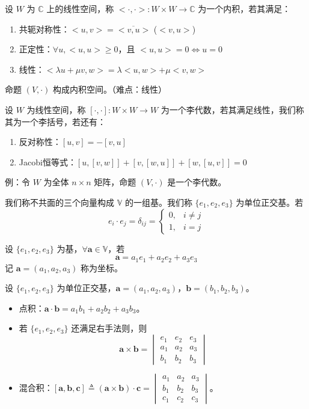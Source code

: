 \documentclass[lang=cn,10pt,thmcnt=section]{elegantbook}
\renewcommand{\vec}[1]{\mathbf{#1}}
\begin{document}
\begin{definition}[内积]
    设 $W$ 为 $\mathbb{C}$ 上的线性空间，称 $<\cdot,\cdot> : W \times W \rightarrow \mathbb{C}$ 为一个内积，若其满足：
    \begin{enumerate}
        \item 共轭对称性：$<u,v> = \overline{<v,u>}$ ($<v,u>$)
        \item 正定性：$\forall u, <u,u> \geq 0$，且 $<u,u> = 0 \Leftrightarrow u = 0$
        \item 线性：$<\lambda u + \mu v, w> = \lambda <u,w> + \mu <v,w>$
    \end{enumerate}
    命题 $(V, \cdot)$ 构成内积空间。（难点：线性）
    \end{definition}
    
    \begin{definition}[李括号]
    设 $W$ 为线性空间，称 $[ \cdot, \cdot ] : W \times W \rightarrow W$ 为一个李代数，若其满足线性，我们称其为一个李括号，若还有：
    \begin{enumerate}
        \item 反对称性：$[u,v] = -[v,u]$
        \item Jacobi恒等式：$[u,[v,w]] + [v,[w,u]] + [w,[u,v]] = 0$
    \end{enumerate}
    例：令 $W$ 为全体 $n \times n$ 矩阵，命题 $(V, \cdot)$ 是一个李代数。
\end{definition}
\begin{definition}[基和坐标]
    我们称不共面的三个向量构成 $\mathbb{V}$ 的一组基。我们称 $\{e_1, e_2, e_3\}$ 为单位正交基。若
\[
e_i \cdot e_j = \delta_{ij} = 
\begin{cases} 
0, & i \neq j \\
1, & i = j 
\end{cases}
\]

设 $\{e_1, e_2, e_3\}$ 为基，$\forall \vec{a} \in \mathbb{V}$，若
\[
\vec{a} = a_1 e_1 + a_2 e_2 + a_3 e_3
\]
记 $\vec{a} = (a_1, a_2, a_3)$ 称为坐标。
\end{definition}
\begin{proposition}[点积、叉积、混合积的公式]
设 $\{e_1, e_2, e_3\}$ 为单位正交基，$\vec{a} = (a_1, a_2, a_3)$，$\vec{b} = (b_1, b_2, b_3)$。
\begin{itemize}
    \item 点积：$\vec{a} \cdot \vec{b} = a_1b_1 + a_2b_2 + a_3b_3$。
    \item 若 $\{e_1, e_2, e_3\}$ 还满足右手法则，则
    \[
    \vec{a} \times \vec{b} = 
    \begin{vmatrix}
    e_1 & e_2 & e_3 \\
    a_1 & a_2 & a_3 \\
    b_1 & b_2 & b_3
    \end{vmatrix}
    \]
    \item 混合积：$[\vec{a}, \vec{b}, \vec{c}] \triangleq (\vec{a} \times \vec{b}) \cdot \vec{c} = 
    \begin{vmatrix}
    a_1 & a_2 & a_3 \\
    b_1 & b_2 & b_3 \\
    c_1 & c_2 & c_3
    \end{vmatrix}$。
\end{itemize}
\end{proposition}
\end{document}
